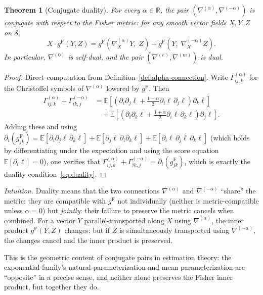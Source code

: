 \documentclass[11pt]{article}
\newcommand{\E}{\mathbb{E}}
\newcommand{\RR}{\mathbb{R}}
\newcommand{\gF}{g^{\mathrm{F}}}
\newtheorem{theorem}{Theorem}
\theoremstyle{remark}
\begin{document}
\begin{theorem}[Conjugate duality]\label{thm:duality}
For every $\alpha \in \RR$, the pair
$(\nabla^{(\alpha)}, \nabla^{(-\alpha)})$ is conjugate with respect to the
Fisher metric: for any smooth vector fields $X, Y, Z$ on $\mathcal{S}$,
\begin{equation}\label{eq:duality}
X \cdot \gF(Y, Z)
= \gF\!\left(\nabla^{(\alpha)}_X Y,\; Z\right)
+ \gF\!\left(Y,\; \nabla^{(-\alpha)}_X Z\right).
\end{equation}
In particular, $\nabla^{(0)}$ is self-dual, and the pair
$(\nabla^{(e)}, \nabla^{(m)})$ is dual.
\end{theorem}

\begin{proof}
Direct computation from Definition~\ref{def:alpha-connection}.  Write
$\Gamma^{(\alpha)}_{ij,k}$ for the Christoffel symbols of
$\nabla^{(\alpha)}$ lowered by $\gF$.  Then
\begin{align*}
\Gamma^{(\alpha)}_{ij,k} + \Gamma^{(-\alpha)}_{ik,j}
&= \E\!\left[\left(\partial_i \partial_j \ell + \frac{1-\alpha}{2}
\partial_i \ell\, \partial_j \ell\right) \partial_k \ell\right] \\
&\quad + \E\!\left[\left(\partial_i \partial_k \ell + \frac{1+\alpha}{2}
\partial_i \ell\, \partial_k \ell\right) \partial_j \ell\right].
\end{align*}
Adding these and using
$\partial_i(\gF_{jk}) = \E[\partial_i \partial_j \ell\, \partial_k \ell]
+ \E[\partial_j \ell\, \partial_i \partial_k \ell]
+ \E[\partial_i \ell\, \partial_j \ell\, \partial_k \ell]$
(which holds by differentiating under the expectation and using the score
equation $\E[\partial_i \ell] = 0$), one verifies that
$\Gamma^{(\alpha)}_{ij,k} + \Gamma^{(-\alpha)}_{ik,j}
= \partial_i(\gF_{jk})$,
which is exactly the duality condition~\eqref{eq:duality}.
\end{proof}

\noindent\emph{Intuition.}  Duality means that the two connections
$\nabla^{(\alpha)}$ and $\nabla^{(-\alpha)}$ ``share'' the metric: they are
compatible with $\gF$ not individually (neither is metric-compatible unless
$\alpha = 0$) but \emph{jointly}: their failure to preserve the metric cancels
when combined.  For a vector $Y$ parallel-transported along $X$ using
$\nabla^{(\alpha)}$, the inner product $\gF(Y, Z)$ changes; but if $Z$ is
simultaneously transported using $\nabla^{(-\alpha)}$, the changes cancel and
the inner product is preserved.

This is the geometric content of conjugate pairs in estimation theory: the
exponential family's natural parameterization and mean parameterization are
``opposite'' in a precise sense, and neither alone preserves the Fisher inner
product, but together they do.
\end{document}
